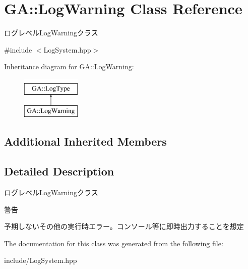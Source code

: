 \hypertarget{class_g_a_1_1_log_warning}{}\section{GA\+::Log\+Warning Class Reference}
\label{class_g_a_1_1_log_warning}


ログレベル\+Log\+Warningクラス  




{\ttfamily \#include $<$Log\+System.\+hpp$>$}

Inheritance diagram for GA\+::Log\+Warning\+:\begin{figure}[H]
\begin{center}
\leavevmode
\includegraphics[height=2.000000cm]{class_g_a_1_1_log_warning}
\end{center}
\end{figure}
\subsection*{Additional Inherited Members}


\subsection{Detailed Description}
ログレベル\+Log\+Warningクラス 

警告

予期しないその他の実行時エラー。コンソール等に即時出力することを想定 

The documentation for this class was generated from the following file\+:\begin{DoxyCompactItemize}
\item 
include/Log\+System.\+hpp\end{DoxyCompactItemize}
